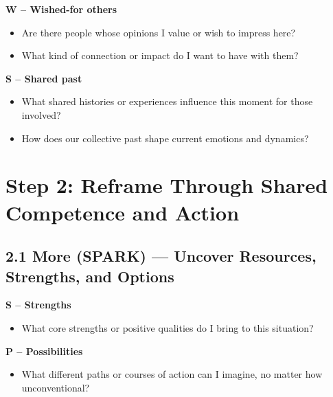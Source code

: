 \documentclass[11pt]{article}
\begin{document}
\textbf{W – Wished-for others}

\begin{itemize}[noitemsep]
  \item Are there people whose opinions I value or wish to impress here?
  \item What kind of connection or impact do I want to have with them?
\end{itemize}
\begin{answerbox}
\vspace{4em}
\end{answerbox}

\textbf{S – Shared past}

\begin{itemize}[noitemsep]
  \item What shared histories or experiences influence this moment for those involved?
  \item How does our collective past shape current emotions and dynamics?
\end{itemize}
\begin{answerbox}
\vspace{4em}
\end{answerbox}

\section{Step 2: Reframe Through Shared Competence and Action}

\subsection*{2.1 More (SPARK) --- Uncover Resources, Strengths, and Options}

\textbf{S – Strengths}

\begin{itemize}[noitemsep]
  \item What core strengths or positive qualities do I bring to this situation?
\end{itemize}
\begin{answerbox}
\vspace{3em}
\end{answerbox}

\textbf{P – Possibilities}

\begin{itemize}[noitemsep]
  \item What different paths or courses of action can I imagine, no matter how unconventional?
\end{itemize}
\begin{answerbox}
\vspace{3em}
\end{answerbox}
\end{document}
